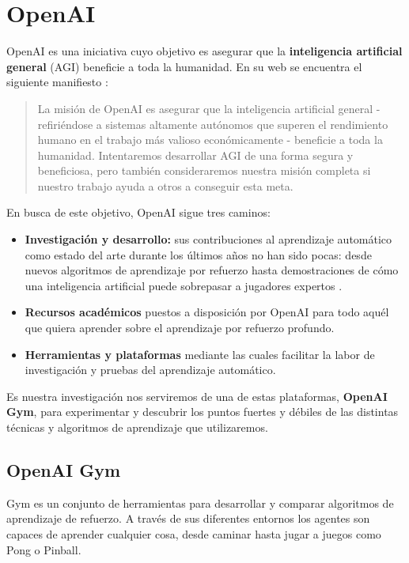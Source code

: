 \section{OpenAI}

OpenAI es una iniciativa cuyo objetivo es asegurar que la \textbf{inteligencia artificial general} (AGI) beneficie a toda la humanidad. En su web se encuentra el siguiente manifiesto \citep{OpenAI_charter}:

\begin{quote}
    La misión de OpenAI es asegurar que la inteligencia artificial general - refiriéndose a sistemas altamente autónomos que superen el rendimiento humano en el trabajo más valioso económicamente - beneficie a toda la humanidad. Intentaremos desarrollar AGI de una forma segura y beneficiosa, pero también consideraremos nuestra misión completa si nuestro trabajo ayuda a otros a conseguir esta meta. 
\end{quote}

En busca de este objetivo, OpenAI sigue tres caminos:
\begin{itemize}
    \item \textbf{Investigación y desarrollo:} sus contribuciones al aprendizaje automático como estado del arte durante los últimos años no han sido pocas: desde nuevos algoritmos de aprendizaje por refuerzo \citep{baselines} hasta demostraciones de cómo una inteligencia artificial puede sobrepasar a jugadores expertos \citep{OpenAI_dota}.
    \item \textbf{Recursos académicos} puestos a disposición por OpenAI \citep{spinningup} para todo aquél que quiera aprender sobre el aprendizaje por refuerzo profundo.
    \item \textbf{Herramientas y plataformas} mediante las cuales facilitar la labor de investigación y pruebas del aprendizaje automático.
\end{itemize}

Es nuestra investigación nos serviremos de una de estas plataformas, \textbf{OpenAI Gym}, para experimentar y descubrir los puntos fuertes y débiles de las distintas técnicas y algoritmos de aprendizaje que utilizaremos.


\subsection{OpenAI Gym}
\label{sec:openai}

Gym es un conjunto de herramientas para desarrollar y comparar algoritmos de aprendizaje de refuerzo. A través de sus diferentes entornos los agentes son capaces de aprender cualquier cosa, desde caminar hasta jugar a juegos como Pong o Pinball.

